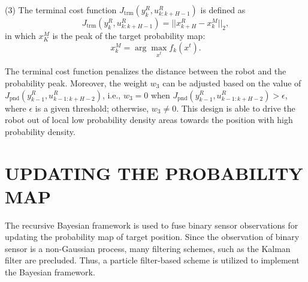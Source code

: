 \documentclass[twocolumn,10pt]{asme2e}
\begin{document}
(3) The terminal cost function $J_\text{trm} (y^R_{k},u^R_{k:k+H-1})$ is defined as
\begin{equation}\label{eqn:obj3}
J_\text{trm} (y^R_k,u^R_{k:k+H-1})=||x_{k+H}^R-x^M_k||_2,
\end{equation}
in which $x^M_K$ is the peak of the target probability map:
\begin{equation}
x^M_k = \arg\max_{x^t} f_k(x^t).
\end{equation}

The terminal cost function penalizes the distance between the robot and the probability peak.
Moreover, the weight $w_3$ can be adjusted based on the value of $J_\text{pnd} (y^R_{k-1},u^R_{k-1:k+H-2})$, i.e., $w_3=0$ when $J_\text{pnd} (y^R_{k-1},u^R_{k-1:k+H-2})>\epsilon$, where $\epsilon$ is a given threshold; otherwise, $w_3\neq 0$.
This design is able to drive the robot out of local low probability density areas towards the position with high probability density.





\section*{UPDATING THE PROBABILITY MAP}\label{sec:update_prob_map}
The recursive Bayesian framework is used to fuse binary sensor observations for updating the probability map of target position.
Since the observation of binary sensor is a non-Gaussian process, many filtering schemes, such as the Kalman filter\cite{kalman1960new,harvey1990forecasting} are precluded.
Thus, a particle filter-based scheme is utilized to implement the Bayesian framework.
\end{document}
